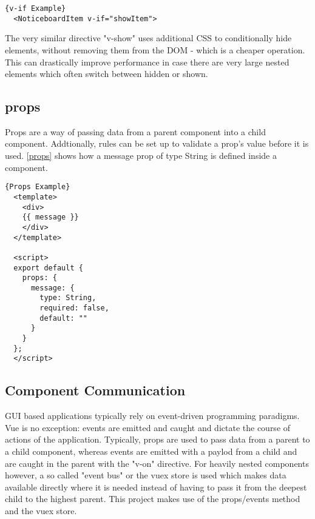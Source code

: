 \begin{lstlisting}[caption=v-if Example, captionpos=b, style=htmlcssjs, label=vmodel]{v-if Example}
  <NoticeboardItem v-if="showItem">
\end{lstlisting}

The very similar directive "v-show" uses additional CSS to conditionally hide elements, without removing them from the DOM - which is a cheaper operation. This can drastically improve performance in case there are very large nested elements which often switch between hidden or shown.

\subsection{props}
Props are a way of passing data from a parent component into a child component. Addtionally, rules can be set up to validate a prop's value before it is used. \autoref{props} shows how a message prop of type String is defined inside a component. \newline

\begin{lstlisting}[caption=Props Example, captionpos=b, style=htmlcssjs, label=props]{Props Example}
  <template>
    <div>
    {{ message }}
    </div>
  </template>

  <script>
  export default {
    props: {
      message: {
        type: String,
        required: false,
        default: ""
      }
    }
  };
  </script>
\end{lstlisting}

\subsection{Component Communication}
GUI based applications typically rely on event-driven programming paradigms. Vue is no exception: events are emitted and caught and dictate the course of actions of the application. Typically, props are used to pass data from a parent to a child component, whereas events are emitted with a paylod from a child and are caught in the parent with the "v-on" directive. For heavily nested components however, a so called "event bus" or the vuex store is used which makes data available directly where it is needed instead of having to pass it from the deepest child to the highest parent. This project makes use of the props/events method and the vuex store.

